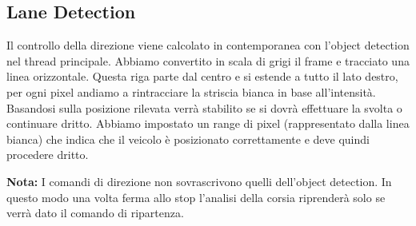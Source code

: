 \documentclass{article}
\begin{document}
  
\newpage

\subsection{Lane Detection}
Il controllo della direzione viene calcolato in contemporanea con l'object detection nel thread principale. Abbiamo convertito in scala di grigi il frame e tracciato una linea orizzontale. Questa riga parte dal centro e si estende a tutto il lato destro, per ogni pixel andiamo a rintracciare la striscia bianca in base all'intensità. Basandosi sulla posizione rilevata verrà stabilito se si dovrà effettuare la svolta o continuare dritto. Abbiamo impostato un range di pixel (rappresentato dalla linea bianca) che indica che il veicolo è posizionato correttamente e deve quindi procedere dritto. 

\textbf{Nota:} I comandi di direzione non sovrascrivono quelli dell'object detection. In questo modo una volta ferma allo stop l'analisi della corsia riprenderà solo se verrà dato il comando di ripartenza. 
\end{document}
